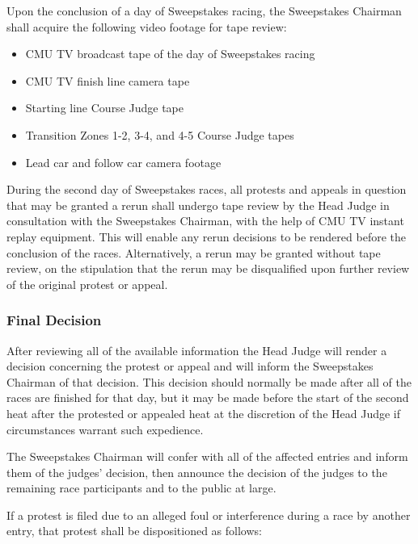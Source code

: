 	Upon the conclusion of a day of Sweepstakes racing, the Sweepstakes Chairman 
	shall acquire the following video footage for tape review:
	
	\begin{itemize}

		\item CMU TV broadcast tape of the day of Sweepstakes racing
		
		\item CMU TV finish line camera tape
		
		\item Starting line Course Judge tape
		
		\item Transition Zones 1-2, 3-4, and 4-5 Course Judge tapes
		
		\item Lead car and follow car camera footage
		
	\end{itemize}
	
	
	During the second day of Sweepstakes races, all protests and appeals in question
	that may be granted a rerun shall undergo tape review by the Head Judge in 
	consultation with the Sweepstakes Chairman, with the help of CMU TV instant 
	replay equipment. This will enable any rerun decisions to be rendered before 
	the conclusion of the races. Alternatively, a rerun may be granted without 
	tape review, on the stipulation that the rerun may be disqualified upon further 
	review of the original protest or appeal.
	

\subsubsection{Final Decision}

	After reviewing all of the available information the Head Judge will render a
	decision concerning the protest or appeal and will inform the Sweepstakes
	Chairman of that decision. This decision should normally be made after all of the 
	races are finished for that day, but it may be made before the start of the second 
	heat after the protested or appealed heat at the discretion of the Head Judge 
	if circumstances warrant such expedience.
	
	The Sweepstakes Chairman will confer with all of the affected entries and inform them 
	of the judges’ decision, then announce the decision of the judges to the remaining 
	race participants and to the public at large. 
	
	\noindent If a protest is filed due to an alleged foul or interference during a race by
	another entry, that protest shall be dispositioned as follows:

